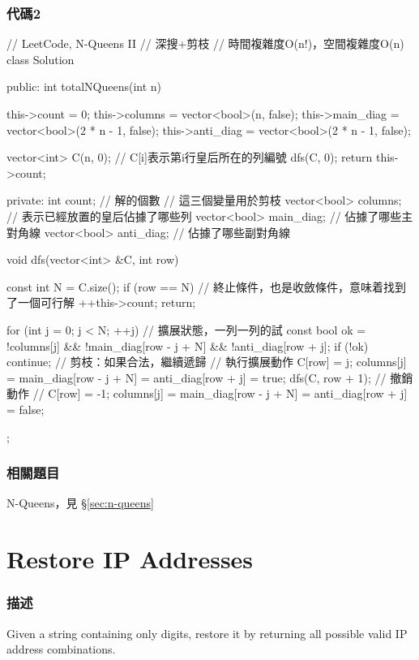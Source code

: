 \subsubsection{代碼2}
\begin{Code}
// LeetCode, N-Queens II
// 深搜+剪枝
// 時間複雜度O(n!)，空間複雜度O(n)
class Solution {
public:
    int totalNQueens(int n) {
        this->count = 0;
        this->columns = vector<bool>(n, false);
        this->main_diag = vector<bool>(2 * n - 1, false);
        this->anti_diag = vector<bool>(2 * n - 1, false);

        vector<int> C(n, 0);  // C[i]表示第i行皇后所在的列編號
        dfs(C, 0);
        return this->count;
    }
private:
    int count; // 解的個數
    // 這三個變量用於剪枝
    vector<bool> columns;  // 表示已經放置的皇后佔據了哪些列
    vector<bool> main_diag;  // 佔據了哪些主對角線
    vector<bool> anti_diag;  // 佔據了哪些副對角線

    void dfs(vector<int> &C, int row) {
        const int N = C.size();
        if (row == N) { // 終止條件，也是收斂條件，意味着找到了一個可行解
            ++this->count;
            return;
        }

        for (int j = 0; j < N; ++j) {  // 擴展狀態，一列一列的試
            const bool ok = !columns[j] &&
                    !main_diag[row - j + N] &&
                    !anti_diag[row + j];
            if (!ok) continue;  // 剪枝：如果合法，繼續遞歸
            // 執行擴展動作
            C[row] = j;
            columns[j] = main_diag[row - j + N] =
                    anti_diag[row + j] = true;
            dfs(C, row + 1);
            // 撤銷動作
            // C[row] = -1;
            columns[j] = main_diag[row - j + N] =
                    anti_diag[row + j] = false;
        }
    }
};
\end{Code}


\subsubsection{相關題目}
\begindot
\item N-Queens，見 \S \ref{sec:n-queens}
\myenddot


\section{Restore IP Addresses} %
\label{sec:restore-ip-addresses}


\subsubsection{描述}
Given a string containing only digits, restore it by returning all possible valid IP address combinations.

